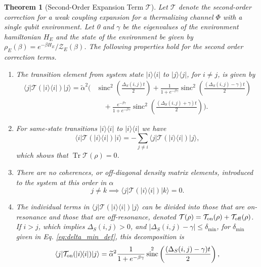 \documentclass{article}
\newtheorem{theorem}{Theorem}
\newcommand{\on}{\rm on}
\newcommand{\off}{\rm off}
\newcommand{\ket}[1]{|#1\rangle}
\newcommand{\bra}[1]{\langle #1|}
\newcommand{\ketbra}[2]{| #1\rangle\! \langle #2|}
\DeclareMathOperator{\Tr}{Tr}
\newcommand{\partfun}{\mathcal{Z}}
\DeclareMathOperator{\sinc}{sinc}
\begin{document}
\begin{theorem}[Second-Order Expansion Term $\mathcal{T}$] \label{thm:second_order_transition}
Let $\mathcal{T}$ denote the second-order correction for a weak coupling expansion for a thermalizing channel $\Phi$ with a single qubit environment. Let 0 and $\gamma$ be the eigenvalues of the environment hamiltonian $H_E$ and the state of the environment be given by $\rho_E(\beta) = e^{-\beta H_E} / \partfun_E(\beta)$. The following properties hold for the second order correction terms.
\begin{enumerate}
    \item 
The transition element from system state $\ketbra{i}{i}$ to $\ketbra{j}{j}$, for $i \neq j$, is given by
\begin{align}
    \bra{j}\mathcal{T}(\ketbra{i}{i}) \ket{j} = \widetilde{\alpha}^2 \Biggr(& \sinc^2 \left( \frac{\Delta_S(i,j)t}{2} \right) + \frac{1}{1 + e^{-\beta \gamma}} \sinc^2 \left( \frac{(\Delta_S(i,j) - \gamma)t}{2} \right) \nonumber\\
    &\quad+  \frac{e^{-\beta \gamma}}{1 + e^{-\beta \gamma}} \sinc^2 \left( \frac{(\Delta_S(i,j) + \gamma)t}{2} \right) \Biggr). \label{eq:transition_terms_total}
\end{align}
\item For same-state transitions $\ketbra{i}{i}$ to $\ketbra{i}{i}$ we have
\begin{equation}
    \bra{i}\mathcal{T}(\ketbra{i}{i})\ket{i} = - \sum_{j \neq i} \bra{j} \mathcal{T}(\ketbra{i}{i}) \ket{j},
\end{equation}
which shows that $\Tr \mathcal{T}(\rho) = 0$. 
\item There are no coherences, or off-diagonal density matrix elements, introduced to the system at this order in $\alpha$
\begin{equation}
    j \neq k \implies \bra{j} \mathcal{T}(\ketbra{i}{i}) \ket{k} = 0.
\end{equation}
\item The individual terms in $\bra{j}\mathcal{T}(\ketbra{i}{i})\ket{j}$ can be divided into those that are on-resonance and those that are off-resonance, denoted $\mathcal{T}(\rho) = \mathcal{T}_{\on}(\rho) + \mathcal{T}_{\off}(\rho)$. If $i > j$, which implies $\Delta_S(i,j) > 0$, and $|\Delta_S(i,j) - \gamma| \le \delta_{\min}$, for $\delta_{\min}$ given in Eq. \eqref{eq:delta_min_def}, this decomposition is
\begin{align}
    \bra{j}\mathcal{T}_{\on}(\ketbra{i}{i})\ket{j} &= \widetilde{\alpha}^2 \frac{1}{1 + e^{-\beta \gamma}} \sinc^2\left( \frac{(\Delta_S(i,j) - \gamma)t}{2} \right), \\

\end{align}
\end{enumerate}
\end{theorem}
\end{document}
